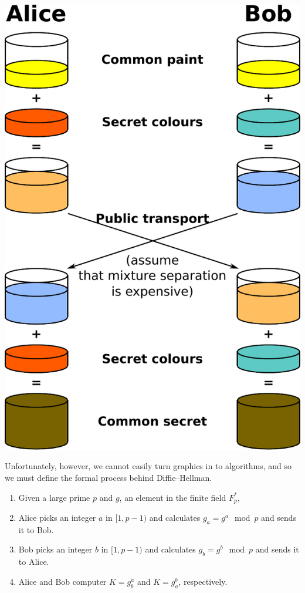   \begin{center}
    \includegraphics[scale=0.6]{./Figures/3-5-2a.pdf}
  \end{center}
  
  Unfortunately, however, we cannot easily turn graphics in to algorithms, and so we must define the formal process behind Diffie--Hellman\cite{Mao:2003uq}.
  
  \begin{enumerate}
    \item Given a large prime $p$ and $g$, an element in the finite field $F_p^*$,
    \item Alice picks an integer $a$ in $[1,p-1)$ and calculates $g_a = g^a \mod p$ and sends it to Bob.
    \item Bob picks an integer $b$ in $[1,p-1)$ and calculates $g_b = g^b \mod p$ and sends it to Alice.
    \item Alice and Bob computer $K = g_b^a$ and $K = g_a^b$, respectively.
  \end{enumerate}
  
